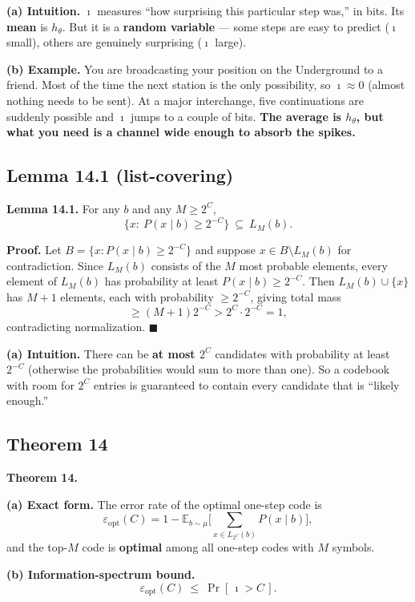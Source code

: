 \documentclass[11pt]{article}
\renewenvironment{quote}
  {\def\FrameCommand{{\color{gray!60}\vrule width 2pt}\hspace{8pt}}%
   \MakeFramed{\advance\hsize-\width \FrameRestore}\begin{itshape}}
  {\end{itshape}\endMakeFramed}
\begin{document}
\textbf{(a) Intuition.} \(\imath\) measures ``how surprising this particular step was,'' in bits. Its \textbf{mean} is \(h_\theta\). But it is a \textbf{random variable} --- some steps are easy to predict (\(\imath\) small), others are genuinely surprising (\(\imath\) large).

\textbf{(b) Example.} You are broadcasting your position on the Underground to a friend. Most of the time the next station is the only possibility, so \(\imath\approx0\) (almost nothing needs to be sent). At a major interchange, five continuations are suddenly possible and \(\imath\) jumps to a couple of bits. \textbf{The average is \(h_\theta\), but what you need is a channel wide enough to absorb the spikes.}

\hypertarget{lemma-14.1-list-covering}{%
\subsection{Lemma 14.1 (list-covering)}\label{lemma-14.1-list-covering}}

\begin{quote}
\textbf{Lemma 14.1.} For any \(b\) and any \(M\ge2^{C}\),
\[\{x:\ P(x\mid b)\ge2^{-C}\}\ \subseteq\ L_M(b).\]
\end{quote}

\textbf{Proof.} Let \(B=\{x:P(x\mid b)\ge2^{-C}\}\) and suppose \(x\in B\setminus L_M(b)\) for contradiction. Since \(L_M(b)\) consists of the \(M\) most probable elements, every element of \(L_M(b)\) has probability at least \(P(x\mid b)\ge2^{-C}\). Then \(L_M(b)\cup\{x\}\) has \(M+1\) elements, each with probability \(\ge2^{-C}\), giving total mass
\[\ge(M+1)2^{-C}>2^{C}\cdot2^{-C}=1,\]
contradicting normalization. \(\blacksquare\)

\textbf{(a) Intuition.} There can be \textbf{at most \(2^C\)} candidates with probability at least \(2^{-C}\) (otherwise the probabilities would sum to more than one). So a codebook with room for \(2^C\) entries is guaranteed to contain every candidate that is ``likely enough.''

\hypertarget{theorem-14-1}{%
\subsection{Theorem 14}\label{theorem-14-1}}

\begin{quote}
\textbf{Theorem 14.}

\textbf{(a) Exact form.} The error rate of the optimal one-step code is
\[\varepsilon_{\mathrm{opt}}(C)=1-\mathbb E_{b\sim\mu}\Big[\sum_{x\in L_{2^C}(b)}P(x\mid b)\Big],\]
and the top-\(M\) code is \textbf{optimal} among all one-step codes with \(M\) symbols.

\textbf{(b) Information-spectrum bound.}
\[\varepsilon_{\mathrm{opt}}(C)\ \le\ \Pr[\,\imath>C\,].\]
\end{quote}
\end{document}
